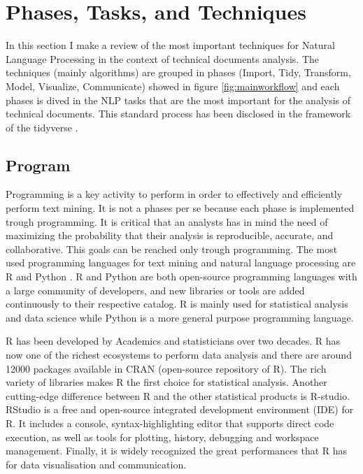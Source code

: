 \documentclass[]{book}
\theoremstyle{definition}
\theoremstyle{definition}
\theoremstyle{definition}
\theoremstyle{remark}
\begin{document}
\chapter{Phases, Tasks, and Techniques}\label{sotatools}

In this section I make a review of the most important techniques for
Natural Language Processing in the context of technical documents
analysis. The techniques (mainly algorithms) are grouped in phases
(Import, Tidy, Transform, Model, Visualize, Communicate) showed in
figure \ref{fig:mainworkflow} and each phases is dived in the NLP tasks
that are the most important for the analysis of technical documents.
This standard process has been disclosed in the framework of the
tidyverse \citep{wickham2016r}.

\section{Program}\label{sotatoolsprogram}

Programming is a key activity to perform in order to effectively and
efficiently perform text mining. It is not a phases per se because each
phase is implemented trough programming. It is critical that an analysts
has in mind the need of maximizing the probability that their analysis
is reproducible, accurate, and collaborative. This goals can be reached
only trough programming. The most used programming languages for text
mining and natural language processing are R \citep{r2008} and Python
\citep{py95}. R and Python are both open-source programming languages
with a large community of developers, and new libraries or tools are
added continuously to their respective catalog. R is mainly used for
statistical analysis and data science while Python is a more general
purpose programming language.

R has been developed by Academics and statisticians over two decades. R
has now one of the richest ecosystems to perform data analysis and there
are around 12000 packages available in CRAN (open-source repository of
R). The rich variety of libraries makes R the first choice for
statistical analysis. Another cutting-edge difference between R and the
other statistical products is R-studio. RStudio is a free and
open-source integrated development environment (IDE) for R. It includes
a console, syntax-highlighting editor that supports direct code
execution, as well as tools for plotting, history, debugging and
workspace management. Finally, it is widely recognized the great
performances that R has for data visualisation and communication.
\end{document}
